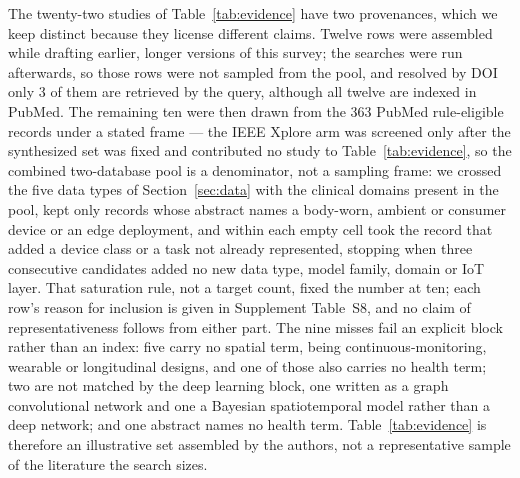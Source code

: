 \documentclass[journal]{IEEEtran}
\newif\ifsubmission
\begin{document}
The twenty-two studies of Table~\ref{tab:evidence} have two provenances, which we keep distinct because they license different claims. Twelve rows were assembled while drafting earlier, longer versions of this survey; the searches were run afterwards, so those rows were not sampled from the pool, and resolved by DOI only 3 of them are retrieved by the query, although all twelve are indexed in PubMed. The remaining ten were then drawn from the 363 PubMed rule-eligible records under a stated frame --- the IEEE Xplore arm was screened only after the synthesized set was fixed and contributed no study to Table~\ref{tab:evidence}, so the combined two-database pool is a denominator, not a sampling frame: we crossed the five data types of Section~\ref{sec:data} with the clinical domains present in the pool, kept only records whose abstract names a body-worn, ambient or consumer device or an edge deployment, and within each empty cell took the record that added a device class or a task not already represented, stopping when three consecutive candidates added no new data type, model family, domain or IoT layer. That saturation rule, not a target count, fixed the number at ten; each row's reason for inclusion is given in Supplement Table~S8, and no claim of representativeness follows from either part.\ifsubmission\else{} The nine misses fail an explicit block rather than an index: five carry no spatial term, being continuous-monitoring, wearable or longitudinal designs, and one of those also carries no health term; two are not matched by the deep learning block, one written as a graph convolutional network and one a Bayesian spatiotemporal model rather than a deep network; and one abstract names no health term.\fi{} Table~\ref{tab:evidence} is therefore an illustrative set assembled by the authors, not a representative sample of the literature the search sizes.
\end{document}
